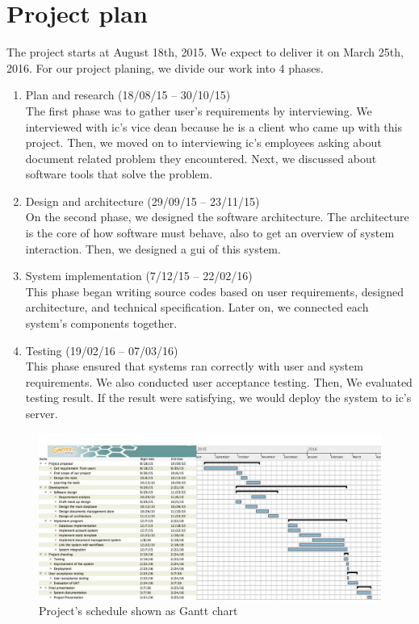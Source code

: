\section{Project plan}
The project starts at August 18th, 2015.
We expect to deliver it on March 25th, 2016.
For our project planing, we divide our work into 4 phases.
\begin{enumerate}
\item Plan and research (18/08/15 -- 30/10/15) \hfill \\
The first phase was to gather user's requirements by interviewing.
We interviewed with \gls{ic}'s vice dean because he is a client who came up with this project.
Then, we moved on to interviewing \gls{ic}'s employees asking about document related problem they encountered.
Next, we discussed about software tools that solve the problem.
\item Design and architecture (29/09/15 -- 23/11/15) \hfill \\
On the second phase, we designed the software architecture.
The architecture is the core of how software must behave, also to get an overview of system interaction.
Then, we designed a \gls{gui} of this system.
\item System implementation (7/12/15 -- 22/02/16) \hfill \\
This phase began writing source codes based on user requirements, designed architecture, and technical specification.
Later on, we connected each system's components together.
\item Testing (19/02/16 -- 07/03/16) \hfill \\
This phase ensured that systems ran correctly with user and system requirements.
We also conducted user acceptance testing.
Then, We evaluated testing result.
If the result were satisfying, we would deploy the system to \gls{ic}'s server.
\end{enumerate}

\begin{landscape}
\begin{figure}
\centering
\caption{Project's schedule shown as Gantt chart}
\label{fig:project-schedule}
\includegraphics[scale=0.4]{res/project_plan}
\end{figure}
\end{landscape}